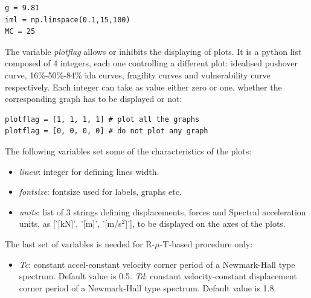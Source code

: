 \begin{Verbatim}[frame=single, commandchars=\\\{\}, samepage=true]
g = 9.81
iml = np.linspace(0.1,15,100)
MC = 25
\end{Verbatim}

The variable \textit{plotflag} allows or inhibits the displaying of plots. It is a python list composed of 4 integers, each one controlling a different plot: idealised pushover curve, 16\%-50\%-84\% ida curves, fragility curves and vulnerability curve respectively. Each integer can take as value either zero or one, whether the corresponding graph has to be displayed or not:

\begin{Verbatim}[frame=single, commandchars=\\\{\}, samepage=true]
plotflag = [1, 1, 1, 1] # plot all the graphs
plotflag = [0, 0, 0, 0] # do not plot any graph
\end{Verbatim}

The following variables set some of the characteristics of the plots:

\begin{itemize}
\item \textit{linew}: integer for defining lines width.
\item \textit{fontsize}: fontsize used for labels, graphs etc.
\item \textit{units}: list of 3 strings defining displacements, forces and Spectral acceleration units, as ['[kN]', '[m]', '[m/s$^2$]'], to be displayed on the axes of the plots.
\end{itemize}

The last set of variables is needed for R-$\mu$-T-based procedure only:
\begin{itemize}
\item \textit{Tc}: constant accel-constant velocity corner period of a Newmark-Hall type spectrum. Default value is 0.5.
\textit{Td}: constant velocity-constant displacement corner period of a Newmark-Hall type spectrum. Default value is 1.8.
\end{itemize}
